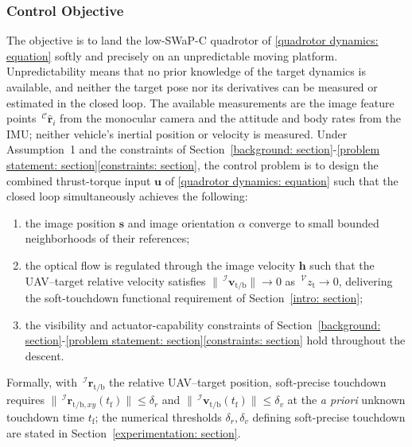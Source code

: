 \documentclass{IEEEtaes}
\begin{document}
\subsubsection{Control Objective} \label{control objective: section}
The objective is to land the low-SWaP-C quadrotor of \eqref{quadrotor dynamics: equation} softly and precisely on an unpredictable moving platform. Unpredictability means that no prior knowledge of the target dynamics is available, and neither the target pose nor its derivatives can be measured or estimated in the closed loop. The available measurements are the image feature points $\,^\mathcal{C}\hat{\boldsymbol{r}}_i$ from the monocular camera and the attitude and body rates from the IMU; neither vehicle's inertial position or velocity is measured. Under Assumption~1 and the constraints of Section~\ref{background: section}-\ref{problem statement: section}\ref{constraints: section}, the control problem is to design the combined thrust-torque input $\boldsymbol{u}$ of \eqref{quadrotor dynamics: equation} such that the closed loop simultaneously achieves the following:
\begin{enumerate}
    \item the image position $\boldsymbol{s}$ and image orientation $\alpha$ converge to small bounded neighborhoods of their references;
    \item the optical flow is regulated through the image velocity $\boldsymbol{h}$ such that the UAV--target relative velocity satisfies $\|\,^\mathcal{I}\boldsymbol{v}_\text{t/b}\|\to 0$ as $\,^\mathcal{V}z_\text{t}\to 0$, delivering the soft-touchdown functional requirement of Section~\ref{intro: section};
    \item the visibility and actuator-capability constraints of Section~\ref{background: section}-\ref{problem statement: section}\ref{constraints: section} hold throughout the descent.
\end{enumerate}
Formally, with $\,^\mathcal{I}\boldsymbol{r}_\text{t/b}$ the relative UAV--target position, soft-precise touchdown requires $\|\,^\mathcal{I}\boldsymbol{r}_{\text{t/b},xy}(t_\text{f})\|\le\delta_r$ and $\|\,^\mathcal{I}\boldsymbol{v}_\text{t/b}(t_\text{f})\|\le\delta_v$ at the \emph{a priori} unknown touchdown time $t_\text{f}$; the numerical thresholds $\delta_r,\delta_v$ defining soft-precise touchdown are stated in Section~\ref{experimentation: section}.
\end{document}

